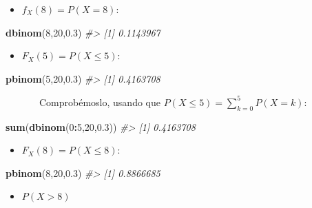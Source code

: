\documentclass[
]{book}
\newenvironment{Shaded}{\begin{snugshade}}{\end{snugshade}}
\newcommand{\CommentTok}[1]{\textcolor[rgb]{0.56,0.35,0.01}{\textit{#1}}}
\newcommand{\DecValTok}[1]{\textcolor[rgb]{0.00,0.00,0.81}{#1}}
\newcommand{\FloatTok}[1]{\textcolor[rgb]{0.00,0.00,0.81}{#1}}
\newcommand{\KeywordTok}[1]{\textcolor[rgb]{0.13,0.29,0.53}{\textbf{#1}}}
\newcommand{\NormalTok}[1]{#1}
\newcommand{\OperatorTok}[1]{\textcolor[rgb]{0.81,0.36,0.00}{\textbf{#1}}}
\providecommand{\tightlist}{%
  \setlength{\itemsep}{0pt}\setlength{\parskip}{0pt}}
\theoremstyle{definition}
\theoremstyle{definition}
\theoremstyle{definition}
\theoremstyle{remark}
\begin{document}
\begin{itemize}
\tightlist
\item
  \(f_X(8)=P(X=8)\):
\end{itemize}

\begin{Shaded}
\begin{Highlighting}[]
\KeywordTok{dbinom}\NormalTok{(}\DecValTok{8}\NormalTok{,}\DecValTok{20}\NormalTok{,}\FloatTok{0.3}\NormalTok{)  }
\CommentTok{\#\textgreater{} [1] 0.1143967}
\end{Highlighting}
\end{Shaded}

\begin{itemize}
\tightlist
\item
  \(F_X(5)=P(X\leqslant 5)\):
\end{itemize}

\begin{Shaded}
\begin{Highlighting}[]
\KeywordTok{pbinom}\NormalTok{(}\DecValTok{5}\NormalTok{,}\DecValTok{20}\NormalTok{,}\FloatTok{0.3}\NormalTok{)  }
\CommentTok{\#\textgreater{} [1] 0.4163708}
\end{Highlighting}
\end{Shaded}

~~~~~~~Comprobémoslo, usando que \(P(X\leqslant 5)=\sum_{k=0}^5 P(X=k)\):

\begin{Shaded}
\begin{Highlighting}[]
\KeywordTok{sum}\NormalTok{(}\KeywordTok{dbinom}\NormalTok{(}\DecValTok{0}\OperatorTok{:}\DecValTok{5}\NormalTok{,}\DecValTok{20}\NormalTok{,}\FloatTok{0.3}\NormalTok{))}
\CommentTok{\#\textgreater{} [1] 0.4163708}
\end{Highlighting}
\end{Shaded}

\begin{itemize}
\tightlist
\item
  \(F_X(8)=P(X\leqslant 8)\):
\end{itemize}

\begin{Shaded}
\begin{Highlighting}[]
\KeywordTok{pbinom}\NormalTok{(}\DecValTok{8}\NormalTok{,}\DecValTok{20}\NormalTok{,}\FloatTok{0.3}\NormalTok{)  }
\CommentTok{\#\textgreater{} [1] 0.8866685}
\end{Highlighting}
\end{Shaded}

\begin{itemize}
\tightlist
\item
  \(P(X>8)\)
\end{itemize}
\end{document}
